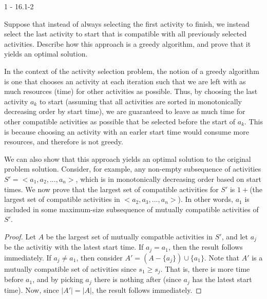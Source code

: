 \documentclass[11pt]{article}
\begin{document}

\begin{prob}{1 - 16.1-2}

Suppose that instead of always selecting the first activity to finish, we instead select the last activity to start that is compatible with all previously selected activities. Describe how this approach is a greedy algorithm, and prove that it yields an optimal solution.
\end{prob}
\begin{sol}

In the context of the activity selection problem, the notion of a greedy algorithm is one that chooses an activity at each iteration such that we are left with as much resources (time) for other activities as possible. Thus, by choosing the last activity $a_k$ to start (assuming that all activities are sorted in monotonically decreasing order by start time), we are guaranteed to leave as much time for other compatible activities as possible that be selected before the start of $a_k$. This is because choosing an activity with an earler start time would consume more resources, and therefore is not greedy. 

We can also show that this approach yields an optimal solution to the original problem solution. Consider, for example, any non-empty subsequence of activities $S' = <a_1, a_2, ..., a_n>$, which is in monotonically decreasing order based on start times. We now prove that the largest set of compatible activities for $S'$ is $1 + $(the largest set of compatible activities in $<a_2, a_3,..., a_n>$). In other words, $a_1$ is included in some maximum-size subsequence of mutually compatible activities of $S'$.

\begin{proof}
Let $A$ be the largest set of mutually compatble activities in $S'$, and let $a_j$ be the activitiy with the latest start time. If $a_j = a_1$, then the result follows immediately. If $a_j \not= a_1$, then consider $A' = (A - \{a_j\}) \cup \{a_1\}$. Note that $A'$ is a mutually compatible set of activities since $s_1 \geq s_j$. That is, there is more time before $a_1$, and by picking $a_j$ there is nothing after (since $a_j$ has the latest start time). Now, since $|A'| = |A|$, the result follows immediately.
\end{proof}


\end{sol}
\end{document}
